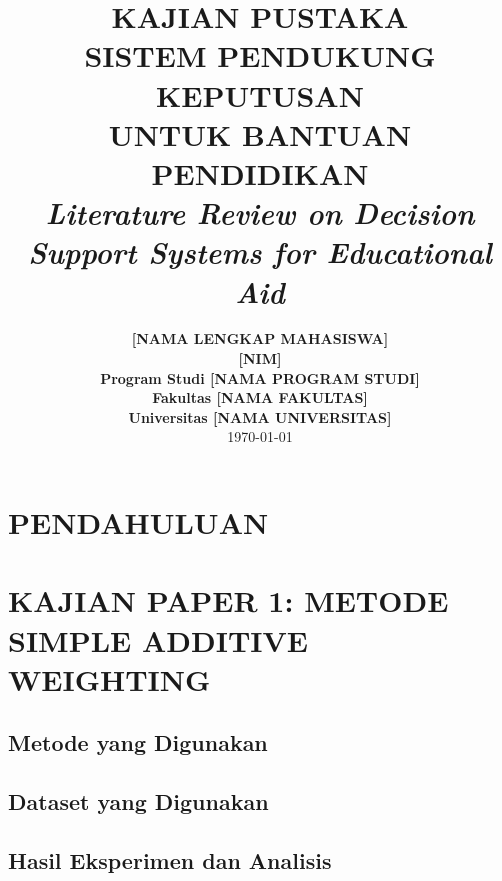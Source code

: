 \documentclass[10pt,a4paper]{article}
\title{
    \vspace{-2cm}
    \Huge\textbf{KAJIAN PUSTAKA}\\
    \vspace{0.5cm}
    \Large\textbf{SISTEM PENDUKUNG KEPUTUSAN}\\
    \Large\textbf{UNTUK BANTUAN PENDIDIKAN}\\
    \vspace{1cm}
    \normalsize\textit{Literature Review on Decision Support Systems for Educational Aid}
}
\author{
    \textbf{[NAMA LENGKAP MAHASISWA]}\\
    \textbf{[NIM]}\\
    \vspace{0.5cm}
    \textbf{Program Studi [NAMA PROGRAM STUDI]}\\
    \textbf{Fakultas [NAMA FAKULTAS]}\\
    \textbf{Universitas [NAMA UNIVERSITAS]}\\
    \vspace{1cm}
    \today
}
\date{}
\begin{document}
\maketitle
\thispagestyle{empty}
\newpage

\tableofcontents
\thispagestyle{empty}
\newpage

\setcounter{page}{1}

\section{PENDAHULUAN}


\section{KAJIAN PAPER 1: METODE SIMPLE ADDITIVE WEIGHTING}

\subsection{Metode yang Digunakan}


\subsection{Dataset yang Digunakan}


\subsection{Hasil Eksperimen dan Analisis}

\end{document}
